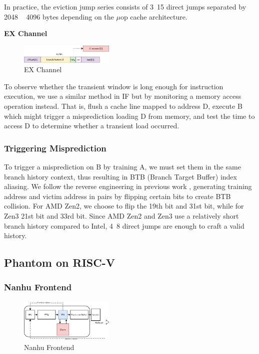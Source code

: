 In practice, the eviction jump series consists of 3~15  direct jumps separated by 2048 ~ 4096 bytes depending on the $\mu$op cache architecture.

\textbf{EX Channel}

\begin{figure}[H]
    \centering
    \includegraphics[width=0.4\textwidth]{Figure/EX Channel.png}
    \caption{EX Channel}
    \label{fig:EX Channel}
\end{figure}

To observe whether the transient window is long enough for instruction execution, we use a similar method in IF but by monitoring a memory access operation instead. That is, flush a cache line mapped to address D, execute B which might trigger a misprediction loading D from memory, and test the time to access D to determine whether a transient load occurred.  


\subsubsection{Triggering Misprediction}

To trigger a misprediction on B by training A, we must set them in the same branch history context, thus resulting in BTB (Branch Target Buffer) index aliasing. We follow the reverse engineering in previous work \cite{retbleed}, generating training address and victim address in pairs by flipping certain bits to create BTB collision. For AMD Zen2, we choose to flip the 19th bit and 31st bit, while for Zen3 21st bit and 33rd bit. Since AMD Zen2 and Zen3 use a relatively short branch history compared to Intel, 4~8 direct jumps are enough to craft a valid history.


\subsection{Phantom on RISC-V}
\subsubsection{Nanhu Frontend}
\begin{figure}[H]
    \centering
    \includegraphics[width=0.4\textwidth]{Figure/xs-frontend.png}
    \caption{Nanhu Frontend}
    \label{fig:xs-frontend}
\end{figure}

